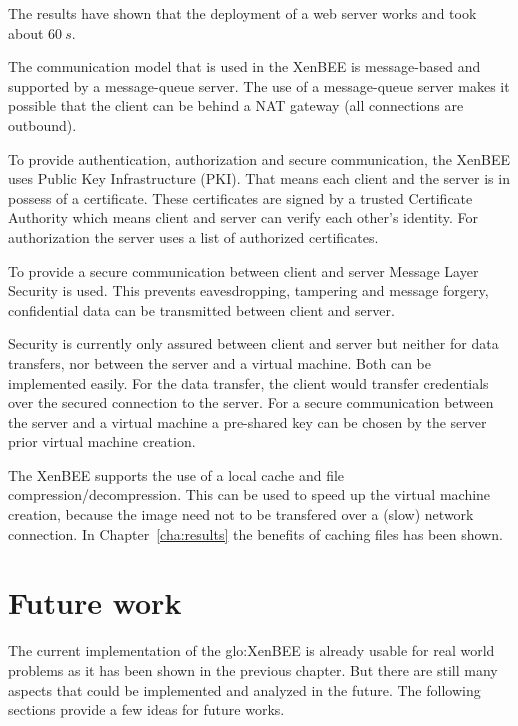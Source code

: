The results have shown that the  deployment of a web server works and took
about $60\ s$.

\medskip

The communication  model that is used  in the XenBEE  is message-based and
supported by  a message-queue  server. The use  of a  message-queue server
makes  it possible  that  the client  can  be behind  a  NAT gateway  (all
connections are outbound).

To  provide authentication,  authorization and  secure  communication, the
XenBEE uses  Public Key Infrastructure  (PKI). That means each  client and
the server is in possess  of a certificate.  These certificates are signed
by  a trusted  Certificate Authority  which  means client  and server  can
verify each other's identity. For  authorization the server uses a list of
authorized certificates.

To provide a secure communication  between client and server Message Layer
Security  is  used. This  prevents  eavesdropping,  tampering and  message
forgery,  \ie confidential  data  can be  transmitted  between client  and
server.

Security is currently  only assured between client and  server but neither
for data transfers, nor between the server and a virtual machine. Both can
be implemented  easily. For the  data transfer, the client  would transfer
credentials  over the  secured connection  to  the server.   For a  secure
communication between  the server and  a virtual machine a  pre-shared key
can be chosen by the server prior virtual machine creation.

\medskip

The   XenBEE   supports   the   use    of   a   local   cache   and   file
compression/decompression.   This can  be  used to  speed  up the  virtual
machine  creation, because  the image  need not  to be  transfered  over a
(slow)  network connection. In  Chapter~\ref{cha:results} the  benefits of
caching files has been shown.

\section*{Future work}

The current  implementation of the \gls{glo:XenBEE} is  already usable for
real world  problems as  it has  been shown in  the previous  chapter. But
there are still many aspects that could be implemented and analyzed in the
future. The following sections provide a few ideas for future works.

